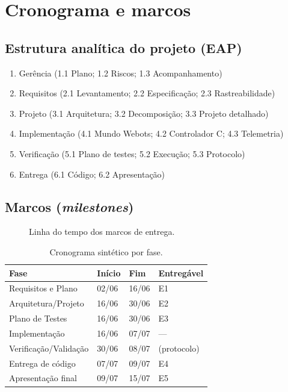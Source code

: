 \section{Cronograma e marcos}
\subsection{Estrutura analítica do projeto (EAP)}
\begin{enumerate}[leftmargin=1.4cm,noitemsep]
  \item[1.] Gerência \quad (1.1 Plano; 1.2 Riscos; 1.3 Acompanhamento)
  \item[2.] Requisitos \quad (2.1 Levantamento; 2.2 Especificação; 2.3 Rastreabilidade)
  \item[3.] Projeto \quad (3.1 Arquitetura; 3.2 Decomposição; 3.3 Projeto detalhado)
  \item[4.] Implementação \quad (4.1 Mundo Webots; 4.2 Controlador C; 4.3 Telemetria)
  \item[5.] Verificação \quad (5.1 Plano de testes; 5.2 Execução; 5.3 Protocolo)
  \item[6.] Entrega \quad (6.1 Código; 6.2 Apresentação)
\end{enumerate}

\subsection{Marcos (\emph{milestones})}
\begin{figure}[H]\centering
{}
\caption{Linha do tempo dos marcos de entrega.}
\end{figure}

\begin{table}[H]\centering
\caption{Cronograma sintético por fase.}
\begin{tabularx}{\textwidth}{@{}X l l l@{}}
\toprule
\textbf{Fase} & \textbf{Início} & \textbf{Fim} & \textbf{Entregável} \\
\midrule
Requisitos e Plano & 02/06 & 16/06 & E1 \\
Arquitetura/Projeto & 16/06 & 30/06 & E2 \\
Plano de Testes & 16/06 & 30/06 & E3 \\
Implementação & 16/06 & 07/07 & --- \\
Verificação/Validação & 30/06 & 08/07 & (protocolo) \\
Entrega de código & 07/07 & 09/07 & E4 \\
Apresentação final & 09/07 & 15/07 & E5 \\
\bottomrule
\end{tabularx}
\end{table}

